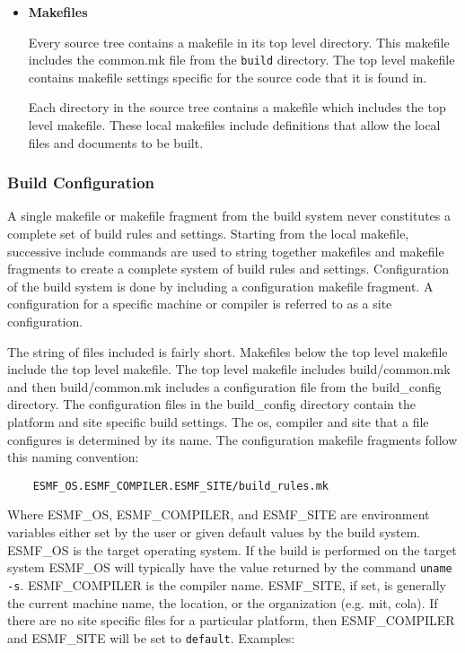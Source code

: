 \begin{itemize}
\begin{description}
\end{description}


\item{{\bf Makefiles}}

Every source tree contains a makefile in its top level directory.  This
makefile includes the common.mk file from the {\tt build} directory.
The top level makefile contains makefile settings specific for the
source code that it is found in.

Each directory in the source tree contains a makefile which includes
the top level makefile.  These local makefiles include definitions that
allow the local files and documents to be built.
\end{itemize}

\subsubsection{Build Configuration}

A single makefile or makefile fragment from the build system never
constitutes a complete set of build rules and settings.  Starting from
the local makefile, successive include commands are used to string
together makefiles and makefile fragments to create a complete system
of build rules and settings.  Configuration of the build system is
done by including a configuration makefile fragment. A configuration for a
specific machine or compiler is referred to as a site configuration.

The string of files included is fairly short.  Makefiles below the top
level makefile include the top level makefile. The top level makefile
includes build/common.mk and then build/common.mk includes a
configuration file from the build\_config directory.  The configuration
files in the build\_config directory contain the platform and site
specific build settings.  The os, compiler and site that a file
configures is determined by its name.  The configuration makefile
fragments follow this naming convention:

\begin{verbatim}
    ESMF_OS.ESMF_COMPILER.ESMF_SITE/build_rules.mk
\end{verbatim}

Where ESMF\_OS, ESMF\_COMPILER, and ESMF\_SITE are environment
variables either set by the user or given default values by the build
system. ESMF\_OS is the target operating system. If the build is performed
on the target system ESMF\_OS will typically have the value returned by the
command {\tt uname -s}. ESMF\_COMPILER is the compiler name. ESMF\_SITE, if set,
is generally the current machine name, the location, or the organization (e.g.
mit, cola).  If there are no site specific files for a particular platform, then
ESMF\_COMPILER and ESMF\_SITE will be set to {\tt default}.  Examples:

